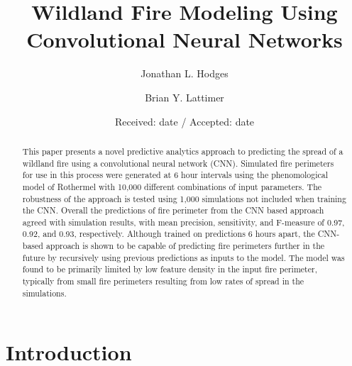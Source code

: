 \documentclass[twocolumn]{svjour3}          %
\begin{document}
\title{Wildland Fire Modeling Using Convolutional Neural Networks
}

\author{Jonathan L. Hodges         \and
        Brian Y. Lattimer
}


\date{Received: date / Accepted: date}


\maketitle

\begin{abstract}
This paper presents a novel predictive analytics approach to predicting
the spread of a wildland fire using a convolutional neural network
(CNN). Simulated fire perimeters for use in this process were
generated at 6 hour intervals using the phenomological model of
Rothermel with 10,000 different combinations of input parameters.
The robustness of the approach is tested using 1,000 simulations not
included when training the CNN. Overall the predictions of
fire perimeter from the CNN based approach agreed with simulation results,
with mean precision, sensitivity, and F-measure of 0.97, 0.92, and 0.93,
respectively. Although trained on predictions 6 hours apart, the
CNN-based approach is shown to be capable of predicting fire perimeters
further in the future by recursively using previous predictions as inputs to
the model. The model was found to be primarily limited by low feature
density in the input fire perimeter, typically from small fire
perimeters resulting from low rates of spread in the simulations.

\end{abstract}




\section{Introduction}
\label{intro}
\end{document}
